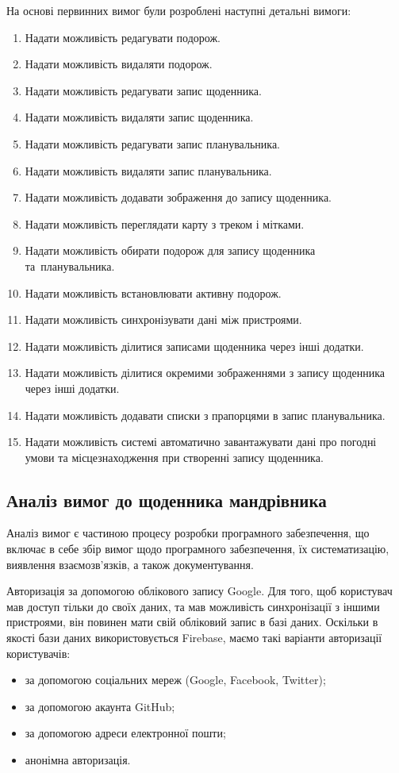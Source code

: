 \documentclass[../main.tex]{subfiles}
\begin{document}
На основі первинних вимог були розроблені наступні детальні вимоги:
\begin{enumerate}
	\item Надати можливість редагувати подорож.
	\item Надати можливість видаляти подорож.
	\item Надати можливість редагувати запис щоденника.
	\item Надати можливість видаляти запис щоденника.
	\item Надати можливість редагувати запис планувальника.
	\item Надати можливість видаляти запис планувальника.
	\item Надати можливість додавати зображення до запису щоденника.
	\item Надати можливість переглядати карту з треком і мітками.
	\item Надати можливість обирати подорож для запису щоденника та~планувальника.
	\item Надати можливість встановлювати активну подорож.
	\item Надати можливість синхронізувати дані між пристроями.
	\item Надати можливість ділитися записами щоденника через інші додатки.
	\item Надати можливість ділитися окремими зображеннями з запису щоденника через інші додатки.
	\item Надати можливість додавати списки з прапорцями в запис планувальника.
	\item Надати можливість системі автоматично завантажувати дані про погодні умови та місцезнаходження при створенні запису щоденника.
\end{enumerate}

\subsection{Аналіз вимог до щоденника мандрівника}
Аналіз вимог є частиною процесу розробки програмного забезпечення, що включає в себе збір вимог щодо програмного забезпечення, їх систематизацію, виявлення взаємозв'язків, а також документування.

Авторизація за допомогою облікового запису Google.
Для того, щоб користувач мав доступ тільки до своїх даних, та мав можливість синхронізації з іншими пристроями, він повинен мати свій обліковий запис в базі даних. Оскільки в якості бази даних використовується Firebase, маємо такі варіанти авторизації користувачів: 
\begin{itemize}[label={--}]
	\item за допомогою соціальних мереж (Google, Facebook, Twitter);
	\item за допомогою акаунта GitHub;
	\item за допомогою адреси електронної пошти;
	\item анонімна авторизація.
\end{itemize}
\end{document}
